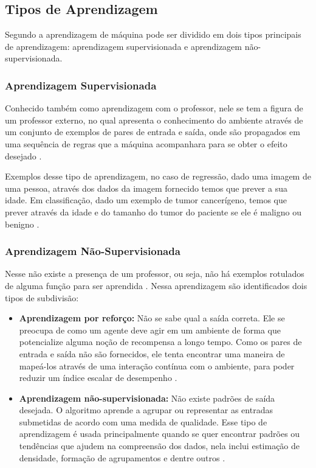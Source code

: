 \subsection{Tipos de Aprendizagem}

\par
Segundo  a aprendizagem de máquina pode ser dividido em dois tipos principais de aprendizagem: aprendizagem supervisionada e aprendizagem não-supervisionada.

\subsubsection{Aprendizagem Supervisionada}

\par
Conhecido também como aprendizagem com o professor, nele se tem a figura de um professor externo, no qual apresenta o conhecimento do ambiente através de um conjunto de exemplos de pares de entrada e saída, onde são propagados em uma sequência de regras que a máquina acompanhara para se obter o efeito desejado \cite{Lorena2007, Henke2011}.

\par
Exemplos desse tipo de aprendizagem, no caso de regressão, dado uma imagem de uma pessoa, através dos dados da imagem fornecido temos que prever a sua idade. Em classificação, dado um exemplo de tumor cancerígeno, temos que prever através da idade e do tamanho do tumor do paciente se ele é maligno ou benigno \cite{Pedro}.

\subsubsection{Aprendizagem Não-Supervisionada}

\par
Nesse não existe a presença de um professor, ou seja, não há exemplos rotulados de alguma função para ser aprendida \cite{Lorena2007, Henke2011}. Nessa aprendizagem são identificados dois tipos de subdivisão:

\begin{itemize}
    \item \textbf{Aprendizagem por reforço:} Não se sabe qual a saída correta. Ele se preocupa de como um agente deve agir em um ambiente de forma que potencialize alguma noção de recompensa a longo tempo. Como os pares de entrada e saída não são fornecidos, ele tenta encontrar uma maneira de mapeá-los através de uma interação contínua com o ambiente, para poder reduzir um índice escalar de desempenho \cite{Henke2011, Alpaydin2009}. 
    \item \textbf{Aprendizagem não-supervisionada:} Não existe padrões de saída desejada. O algoritmo aprende a agrupar ou representar as entradas submetidas de acordo com uma medida de qualidade. Esse tipo de aprendizagem é usada principalmente quando se quer encontrar padrões ou tendências que ajudem na compreensão dos dados, nela inclui estimação de densidade, formação de agrupamentos e dentre outros \cite{Henke2011, Lorena2007}.
\end{itemize}


